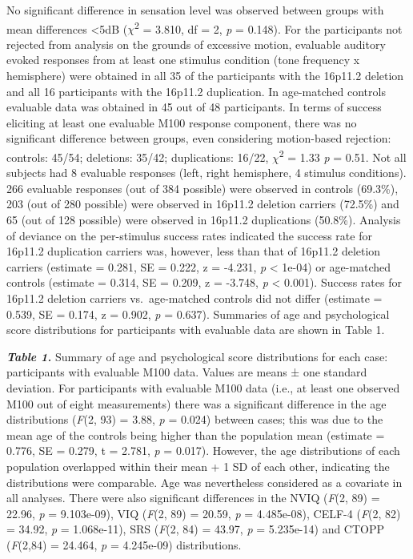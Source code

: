 \documentclass[]{article}
\begin{document}
No significant difference in sensation level was observed between groups
with mean differences \textless{}5dB (\(\chi\)\textsuperscript{2} =
3.810, df = 2, \emph{p} = 0.148). For the participants not rejected from
analysis on the grounds of excessive motion, evaluable auditory evoked
responses from at least one stimulus condition (tone frequency x
hemisphere) were obtained in all 35 of the participants with the 16p11.2
deletion and all 16 participants with the 16p11.2 duplication. In
age-matched controls evaluable data was obtained in 45 out of 48
participants. In terms of success eliciting at least one evaluable M100
response component, there was no significant difference between groups,
even considering motion-based rejection: controls: 45/54; deletions:
35/42; duplications: 16/22, \(\chi\)\textsuperscript{2} = 1.33 \emph{p}
= 0.51. Not all subjects had 8 evaluable responses (left, right
hemisphere, 4 stimulus conditions). 266 evaluable responses (out of 384
possible) were observed in controls (69.3\%), 203 (out of 280 possible)
were observed in 16p11.2 deletion carriers (72.5\%) and 65 (out of 128
possible) were observed in 16p11.2 duplications (50.8\%). Analysis of
deviance on the per-stimulus success rates indicated the success rate
for 16p11.2 duplication carriers was, however, less than that of 16p11.2
deletion carriers (estimate = 0.281, SE = 0.222, z = -4.231, \emph{p}
\textless{} 1e-04) or age-matched controls (estimate = 0.314, SE =
0.209, z = -3.748, \emph{p} \textless{} 0.001). Success rates for
16p11.2 deletion carriers vs.~age-matched controls did not differ
(estimate = 0.539, SE = 0.174, z = 0.902, \emph{p} = 0.637). Summaries
of age and psychological score distributions for participants with
evaluable data are shown in Table 1.

\textbf{\emph{Table 1.}} Summary of age and psychological score
distributions for each case: participants with evaluable M100 data.
Values are means ± one standard deviation. For participants with
evaluable M100 data (i.e., at least one observed M100 out of eight
measurements) there was a significant difference in the age
distributions (\emph{F}(2, 93) = 3.88, \emph{p} = 0.024) between cases;
this was due to the mean age of the controls being higher than the
population mean (estimate = 0.776, SE = 0.279, t = 2.781, \emph{p} =
0.017). However, the age distributions of each population overlapped
within their mean + 1 SD of each other, indicating the distributions
were comparable. Age was nevertheless considered as a covariate in all
analyses. There were also significant differences in the NVIQ
(\emph{F}(2, 89) = 22.96, \emph{p} = 9.103e-09), VIQ (\emph{F}(2, 89) =
20.59, \emph{p} = 4.485e-08), CELF-4 (\emph{F}(2, 82) = 34.92, \emph{p}
= 1.068e-11), SRS (\emph{F}(2, 84) = 43.97, \emph{p} = 5.235e-14) and
CTOPP (\emph{F}(2,84) = 24.464, \emph{p} = 4.245e-09) distributions.
\end{document}
